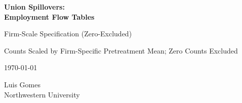 \documentclass[12pt,letterpaper]{article}
\begin{document}
\begin{titlepage}
\centering
\vspace*{2cm}
{\Huge\bfseries Union Spillovers:\\Employment Flow Tables\par}
\vspace{2cm}
{\Large Firm-Scale Specification (Zero-Excluded)\par}
\vspace{0.5cm}
{\large Counts Scaled by Firm-Specific Pretreatment Mean; Zero Counts Excluded\par}
\vspace{1cm}
{\large \today\par}
\vfill
{\large Luis Gomes\\Northwestern University\par}
\end{titlepage}

\tableofcontents
\clearpage
\end{document}
